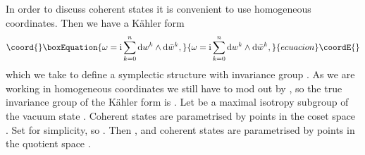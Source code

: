 \documentclass[a4paper,a4paper]{article}
\begin{document}
In order to discuss coherent states it is convenient to use homogeneous coordinates.
Then we have a K\"ahler form
\begin{equation}\coord{}\boxEquation{
\omega={\rm i}\sum_{k=0}^n{\rm d} w^k\wedge {\rm d}\bar w^k,
\label{kahfor}
}{
\omega={\rm i}\sum_{k=0}^n{\rm d} w^k\wedge {\rm d}\bar w^k,
}{ecuacion}\coordE{}\end{equation}
which we take to define a symplectic structure with invariance group \coordHE{}. 
As we are working in homogeneous coordinates we still have to mod out by \coordHE{}, 
so the true invariance group of the K\"ahler form is \coordHE{}.
Let \coordHE{} be a maximal isotropy subgroup \cite{PERELOMOV} of the vacuum state \myHighlight{$|0\rangle $}\coordHE{}. 
Coherent states \myHighlight{$|\zeta\rangle $}\coordHE{} are parametrised by points \myHighlight{$\zeta$}\coordHE{} in the coset space \coordHE{}
\cite{PERELOMOV}. Set \coordHE{} for simplicity, so \coordHE{}.
Then \coordHE{}, and coherent states \coordHE{} are parametrised by points \coordHE{} 
in the quotient space \coordHE{}.
 
\end{document}
